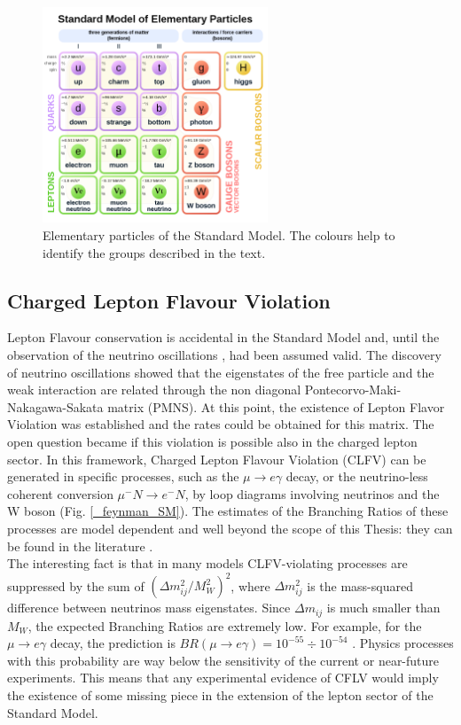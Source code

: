 \documentclass[12pt,a4paper,openright, oneside, titlepage]{book} %
\begin{document}
\begin{figure}[h!]
\centering
\includegraphics[width =0.6\textwidth, keepaspectratio]{SM}
\caption[Elementary particles of the Standard Model]{Elementary particles of the Standard Model. 
The colours help to identify the groups described in the text.}
\label{_SM}
\end{figure}

\subsection{Charged Lepton Flavour Violation}
Lepton Flavour conservation is accidental in the Standard Model and, until the observation of the neutrino oscillations  \cite{oscillations}, had been assumed valid. 
The discovery of neutrino oscillations showed that the eigenstates of the free particle and the weak  interaction are related through the non diagonal Pontecorvo-Maki-Nakagawa-Sakata matrix (PMNS).
At this point, the existence of  Lepton Flavor Violation was established and the rates could be obtained for this matrix.
The open question became if this violation is possible also in the charged lepton sector. 
In this framework, Charged Lepton Flavour Violation (CLFV) can be generated in specific processes, such as the $\mu\rightarrow e\gamma$ decay, or the neutrino-less coherent conversion $\mu^-N \rightarrow e^-N$, by loop diagrams involving neutrinos and the W boson (Fig. \ref{_feynman_SM}).
The estimates of the Branching Ratios of these processes are model dependent and well beyond the scope of this Thesis:  they can be found in the literature  \cite{Signorelli}. \\
The interesting fact is that in many models CLFV-violating processes are suppressed by the sum of $(\Delta m_{ij}^2/M_W^2)^2$, where $\Delta m_{ij}^2$ is the mass-squared difference between neutrinos mass eigenstates. 
Since $\Delta m_{ij}$ is much smaller than $M_W$, the expected Branching Ratios are extremely low. 
For example, for the $\mu\rightarrow e\gamma$ decay, the prediction is $BR(\mu\rightarrow e\gamma)= 10^{-55}\div10^{-54}$ \cite {Petcov}. 
Physics processes with this probability are way below the sensitivity of the current or near-future experiments.
This means that any experimental evidence of CFLV would imply the existence of some missing piece in the extension of the lepton sector of the Standard Model.
\end{document}
